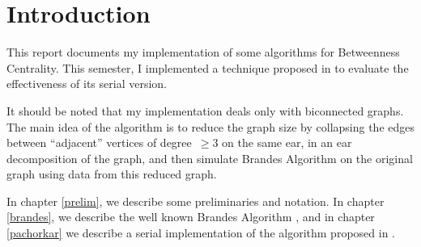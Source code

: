 \chapter{Introduction}
This report documents my implementation of some algorithms for Betweenness
Centrality.
This semester, I implemented a technique proposed in \cite{pachorkar16}
to evaluate the effectiveness of its serial version.

It should be noted that my implementation deals only with biconnected graphs.
The main idea of the algorithm is to reduce the graph size by collapsing
the edges between ``adjacent'' vertices of degree~$\geq 3$ on the same
ear, in an ear decomposition of the graph, and then simulate Brandes
Algorithm on the original graph using data from this reduced graph.

In chapter \ref{prelim}, we describe some preliminaries and notation.
In chapter \ref{brandes}, we describe the well known Brandes Algorithm
\cite{brandes01}, and in chapter \ref{pachorkar} we describe a serial
implementation of the algorithm proposed in \cite{pachorkar16}.
